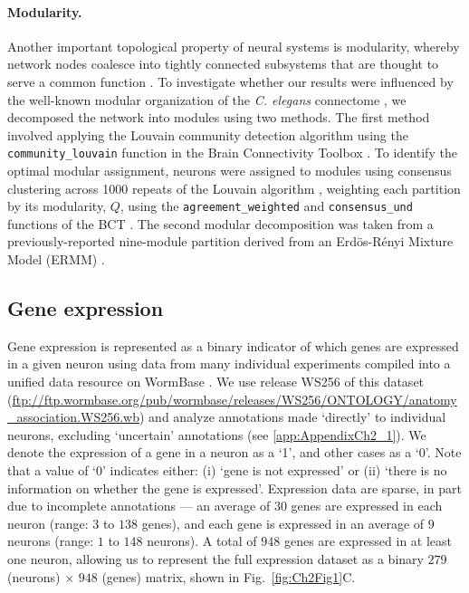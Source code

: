 \paragraph{Modularity.}
Another important topological property of neural systems is modularity, whereby network nodes coalesce into tightly connected subsystems that are thought to serve a common function \citep{Sporns2016}.
To investigate whether our results were influenced by the well-known modular organization of the \emph{C. elegans} connectome \citep{Kim2014a, Pan2010, Bassett2010, Achacoso1992, Pavlovic2014}, we decomposed the network into modules using two methods.
The first method involved applying the Louvain community detection algorithm \citep{Blondel2008} using the \texttt{community\_louvain} function in the Brain Connectivity Toolbox \citep{Rubinov2010}.
To identify the optimal modular assignment, neurons were assigned to modules using consensus clustering across 1000 repeats of the Louvain algorithm \citep{Lancichinetti2012}, weighting each partition by its modularity, $Q$, using the \texttt{agreement\_weighted} and \texttt{consensus\_und} functions of the BCT \citep{Rubinov2010}.
The second modular decomposition was taken from a previously-reported nine-module partition derived from an Erd\"os-R\'enyi Mixture Model (ERMM) \citep{Pavlovic2014}.

\subsection*{Gene expression}
Gene expression is represented as a binary indicator of which genes are expressed in a given neuron using data from many individual experiments compiled into a unified data resource on WormBase \citep{Harris2010}.
We use release WS256 of this dataset (\url{ftp://ftp.wormbase.org/pub/wormbase/releases/WS256/ONTOLOGY/anatomy_association.WS256.wb}) and analyze annotations made `directly' to individual neurons, excluding `uncertain' annotations (see \ref{app:AppendixCh2_1}).
We denote the expression of a gene in a neuron as a `1', and other cases as a `0'.
Note that a value of `0' indicates either:
(i) `gene is not expressed' or
(ii) `there is no information on whether the gene is expressed'.
Expression data are sparse, in part due to incomplete annotations --- an average of $30$ genes are expressed in each neuron (range: $3$ to $138$ genes), and each gene is expressed in an average of $9$ neurons (range: $1$ to $148$ neurons).
A total of $948$ genes are expressed in at least one neuron, allowing us to represent the full expression dataset as a binary $279$ (neurons) $\times$ $948$ (genes) matrix, shown in Fig.~\ref{fig:Ch2Fig1}C.

